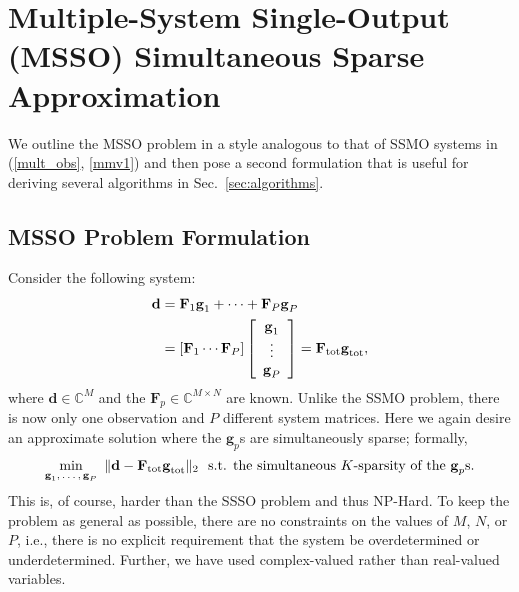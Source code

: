 \documentclass[final]{siamltex}
\newcommand{\field}[1]{\mathbb{#1}}
\newcommand{\la}[1]{\mbox{$\mathbf{#1}$}}  \newcommand{\sst}[1]{\mbox{\scriptsize{#1}}}
\begin{document}
\section{Multiple-System Single-Output (MSSO) Simultaneous Sparse Approximation}
\label{sec:problem}

   We outline the MSSO problem in a style analogous to that of SSMO
   systems in (\ref{mult_obs}, \ref{mmv1}) and then pose a second
   formulation that is useful for deriving several algorithms in
   Sec.~\ref{sec:algorithms}.

\subsection{MSSO Problem Formulation}

   Consider the following system:
   \begin{equation}\label{mmv2_eq1}
   \begin{split}
   \la{d} & = \la{F}_1 \la{g}_1 + \cdots + \la{F}_P \la{g}_P  \\
          & = \left [ \la{F}_1 \cdots \la{F}_P \right ]
                                  \left [ \begin{array}{c}
                                                          \la{g}_1 \\
                                                           \vdots  \\
                                                          \la{g}_P \\
                                          \end{array}
                                  \right ]
          = \la{F}_{\mbox{\scriptsize{tot}}}
            \la{g}_{\mbox{\scriptsize{tot}}},
   \end{split}
   \end{equation}
   where $\la{d} \in \field{C}^{M}$ and the $\la{F}_p \in \field{C}^{M
   \times N}$ are known.  Unlike the SSMO problem, there is now only one
   observation and $P$ different system matrices.  Here we again 
   desire an approximate solution where the $\la{g}_p$s are simultaneously sparse;
   formally,
   \begin{equation}\label{msso_nphard}
         \mathop{\mbox{min}}_{\sst{$\la{g}_1, \ldots, \la{g}_P$}} 
            \mbox{ } \Vert \la{d} - 
         \la{F}_{\mbox{\scriptsize{tot}}} \la{g}_{\mbox{\scriptsize{tot}}}
         \Vert_2 \,\,
            \mbox{ s.t. the simultaneous $K$-sparsity of the $\la{g}_p$s}.
   \end{equation}
   This is, of course, harder than the SSSO problem and thus NP-Hard.
   To keep
   the problem as general as possible, there are no constraints
   on the values of $M$, $N$, or $P$, i.e., there is no explicit requirement
   that the system be overdetermined or underdetermined.  Further,
   we have used complex-valued rather than real-valued variables.
\end{document}
